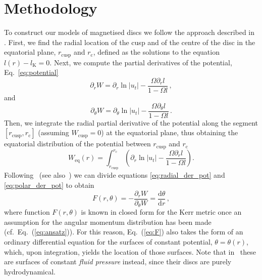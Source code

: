\documentclass{aa}
\begin{document}
\section{Methodology}
\label{methodology}

To construct our models of magnetised discs we follow the approach described in \citet{Qian:2009}. First, we find the radial location of the cusp and of the centre of the disc in the equatorial plane, $r_{\mathrm{cusp}}$ and $r_{\mathrm{c}}$, defined as the solutions to the equation $l(r) - l_{\mathrm{K}} = 0$.
Next, we compute the partial derivatives of the potential, Eq.~\eqref{eq:potential}
\begin{equation}\label{eq:radial_der_pot}
\partial_r W = \partial_r \ln|u_t| - \frac{\Omega \partial_rl}{1 - \Omega l}\,,
\end{equation}
and
\begin{equation}\label{eq:polar_der_pot}
\partial_{\theta} W = \partial_{\theta} \ln|u_t| - \frac{\Omega \partial_{\theta}l}{1 - \Omega l}\,.
\end{equation}
Then, we integrate the radial partial derivative of the potential along the segment $[r_{\mathrm{cusp}}, r_{\mathrm{c}}]$ (assuming $W_{\mathrm{cusp}} = 0$) at the equatorial plane, thus obtaining the equatorial distribution of the potential between $r_{\mathrm{cusp}}$ and $r_{\mathrm{c}}$
\begin{equation}\label{eq:equatorial_pot}
W_{\mathrm{eq}}(r) = \int^{r_{\mathrm{c}}}_{r_{\mathrm{cusp}}}\left(\partial_r \ln|u_t| - \frac{\Omega \partial_rl}{1 - \Omega l}\right).
\end{equation}
Following~\citet{Qian:2009} (see also~\citet{Jaroszynski:1980}) we can divide equations \eqref{eq:radial_der_pot} and \eqref{eq:polar_der_pot} to obtain
\begin{equation}\label{eq:F}
F(r, \theta) = -\frac{\partial_r W}{\partial_{\theta} W} = \frac{\mathrm{d}\theta}{\mathrm{d}r}\,,
\end{equation}
where function $F(r, \theta)$ is known in closed form for the Kerr metric once an assumption for the angular momentum distribution has been made (cf.~Eq.~(\ref{eq:ansatz})). For this reason, Eq.~(\ref{eq:F}) also takes the form of an ordinary differential equation for the surfaces of constant potential, $\theta=\theta(r)$, which, upon integration, yields the location of those surfaces. Note that in~\citet{Qian:2009} these are surfaces of constant {\it fluid pressure} instead, since their discs are purely hydrodynamical.
\end{document}

